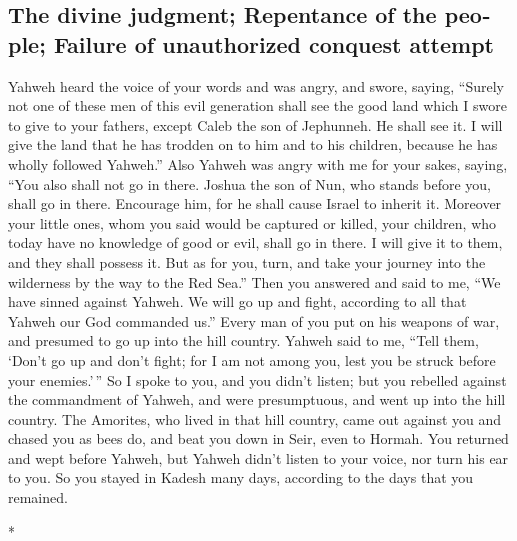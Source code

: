 \begin{paracol}{2}
\begin{otherlanguage}{english}
\hypertarget{the-divine-judgment-repentance-of-the-people-failure-of-unauthorized-conquest-attempt}{%
\subsection{The divine judgment; Repentance of the people; Failure of
unauthorized conquest
attempt}\label{the-divine-judgment-repentance-of-the-people-failure-of-unauthorized-conquest-attempt}}

 Yahweh heard the voice of your words and was angry, and
swore, saying,  ``Surely not one of these men of this
evil generation shall see the good land which I swore to give to your
fathers,  except Caleb the son of Jephunneh. He shall see
it. I will give the land that he has trodden on to him and to his
children, because he has wholly followed Yahweh.''  Also
Yahweh was angry with me for your sakes, saying, ``You also shall not go
in there.  Joshua the son of Nun, who stands before you,
shall go in there. Encourage him, for he shall cause Israel to inherit
it.  Moreover your little ones, whom you said would be
captured or killed, your children, who today have no knowledge of good
or evil, shall go in there. I will give it to them, and they shall
possess it.  But as for you, turn, and take your journey
into the wilderness by the way to the Red Sea.''  Then
you answered and said to me, ``We have sinned against Yahweh. We will go
up and fight, according to all that Yahweh our God commanded us.'' Every
man of you put on his weapons of war, and presumed to go up into the
hill country.  Yahweh said to me, ``Tell them, `Don't go
up and don't fight; for I am not among you, lest you be struck before
your enemies.'\,''  So I spoke to you, and you didn't
listen; but you rebelled against the commandment of Yahweh, and were
presumptuous, and went up into the hill country.  The
Amorites, who lived in that hill country, came out against you and
chased you as bees do, and beat you down in Seir, even to Hormah.
 You returned and wept before Yahweh, but Yahweh didn't
listen to your voice, nor turn his ear to you.  So you
stayed in Kadesh many days, according to the days that you remained.

\end{otherlanguage}

\switchcolumn[0]*

\hypertarget{mirando-hacia-atruxe1s-en-el-viaje-pacuxedfico-a-travuxe9s-de-la-tierra-de-los-edomitas-y-los-moabitas-prohibiciuxf3n-de-atacar-a-los-amonitas-derrota-del-rey-amorreo-sehon}{%
}
\end{paracol}
